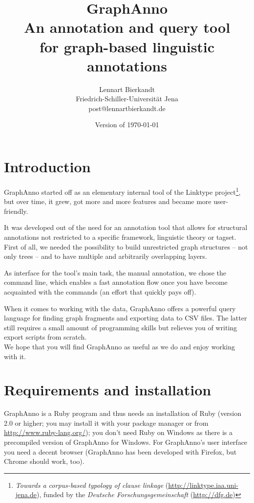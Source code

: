 \documentclass[12pt]{scrartcl}
\title{\LARGE GraphAnno\\ \large An annotation and query tool\\for graph-based linguistic annotations}
\author{Lennart Bierkandt\\\large Friedrich-Schiller-Universität Jena\\[-.2em]\large post@lennartbierkandt.de}
\date{Version of \today}
\begin{document}
\maketitle

\renewcommand{\baselinestretch}{1.05}\normalsize

\tableofcontents



\section{Introduction}

GraphAnno started off as an elementary internal tool of the Linktype project\footnote{\textit{Towards a corpus-based typology of clause linkage} (\url{http://linktype.iaa.uni-jena.de}), funded by the \textit{Deutsche Forschungsgemeinschaft} (\url{http://dfg.de})}, but over time, it grew, got more and more features and became more user-friendly.

It was developed out of the need for an annotation tool that allows for structural annotations not restricted to a specific framework, linguistic theory or tagset.
First of all, we needed the possibility to build unrestricted graph structures – not only trees – and to have multiple and arbitrarily overlapping layers.

As interface for the tool’s main task, the manual annotation, we chose the command line, which enables a fast annotation flow once you have become acquainted with the commands (an effort that quickly pays off).

When it comes to working with the data, GraphAnno offers a powerful query language for finding graph fragments and exporting data to CSV files.
The latter still requires a small amount of programming skills but relieves you of writing export scripts from scratch.\\

We hope that you will find GraphAnno as useful as we do and enjoy working with it.



\section{Requirements and installation}

GraphAnno is a Ruby program and thus needs an installation of Ruby (version 2.0 or higher; you may install it with your package manager or from \url{http://www.ruby-lang.org/}); you don’t need Ruby on Windows as there is a precompiled version of GraphAnno for Windows. For GraphAnno’s user interface you need a decent browser (GraphAnno has been developed with Firefox, but Chrome should work, too).\\
\end{document}
